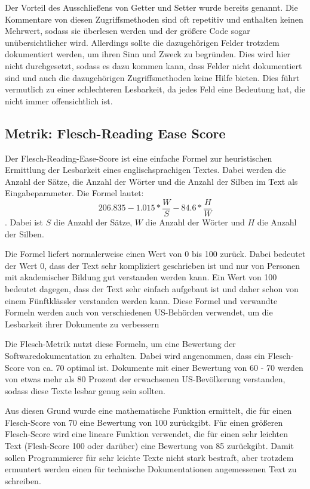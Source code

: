 Der Vorteil des Ausschließens von Getter und Setter wurde bereits genannt. Die Kommentare von diesen Zugriffsmethoden sind oft repetitiv und enthalten keinen Mehrwert, sodass sie überlesen werden und der größere Code sogar unübersichtlicher wird. Allerdings sollte die dazugehörigen Felder trotzdem dokumentiert werden, um ihren Sinn und Zweck zu begründen. Dies wird hier nicht durchgesetzt, sodass es dazu kommen kann, dass Felder nicht dokumentiert sind und auch die dazugehörigen Zugriffsmethoden keine Hilfe bieten. Dies führt vermutlich zu einer schlechteren Lesbarkeit, da jedes Feld eine Bedeutung hat, die nicht immer offensichtlich ist.
\subsection{Metrik: Flesch-Reading Ease Score}\label{chapter:metrics_flesh}
Der Flesch-Reading-Ease-Score\cite[S. 21]{ThePrinciplesofReadability} ist eine einfache Formel zur heuristischen Ermittlung der Lesbarkeit eines englischsprachigen Textes. Dabei werden die Anzahl der Sätze, die Anzahl der Wörter und die Anzahl der Silben im Text als Eingabeparameter. Die Formel lautet:
\begin{equation}
   206.835-1.015*\frac{W}{S}-84.6*\frac{H}{W}
\end{equation}. Dabei ist $S$ die Anzahl der Sätze, $W$ die Anzahl der Wörter und $H$ die Anzahl der Silben. 

Die Formel liefert normalerweise einen Wert von 0 bis 100 zurück. Dabei bedeutet der Wert 0, dass der Text sehr kompliziert geschrieben ist und nur von Personen mit akademischer Bildung gut verstanden werden kann. Ein Wert von 100 bedeutet dagegen, dass der Text sehr einfach aufgebaut ist und daher schon von einem Fünftklässler verstanden werden kann. Diese Formel und verwandte Formeln werden auch von verschiedenen US-Behörden verwendet, um die Lesbarkeit ihrer Dokumente zu verbessern\cite[S. 72]{AutomaticQualityAssessmentofSourceCodeComments:TheJavadocMiner}

Die Flesch-Metrik nutzt diese Formeln, um eine Bewertung der Softwaredokumentation zu erhalten. Dabei wird angenommen, dass ein Flesch-Score von ca. 70 optimal ist. Dokumente mit einer Bewertung von 60 - 70 werden von etwas mehr als 80 Prozent der erwachsenen US-Bevölkerung verstanden, sodass diese Texte lesbar genug sein sollten.

Aus diesen Grund wurde eine mathematische Funktion ermittelt, die für einen Flesch-Score von 70 eine Bewertung von 100 zurückgibt. Für einen größeren Flesch-Score wird eine lineare Funktion verwendet, die für einen sehr leichten Text (Flesh-Score 100 oder darüber) eine Bewertung von 85 zurückgibt. Damit sollen Programmierer für sehr leichte Texte nicht stark bestraft, aber trotzdem ermuntert werden einen für technische Dokumentationen angemessenen Text zu schreiben.

